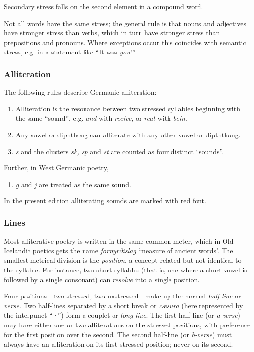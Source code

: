     Secondary stress falls on the second element in a compound word.

    Not all words have the same stress; the general rule is that nouns and adjectives have stronger stress than verbs, which in turn have stronger stress than prepositions and pronouns.  Where exceptions occur this coincides with semantic stress, e.g. in a statement like “It was \emph{you}!”

    \subsubsection{Alliteration}
    The following rules describe Germanic alliteration:

    \begin{enumerate}
      \item Alliteration is the resonance between two stressed syllables beginning with the same “sound”, e.g. \emph{and} with \emph{reeive}, or \emph{reat} with \emph{bein}.
      \item Any vowel or diphthong can alliterate with any other vowel or dipththong.
      \item \emph{s} and the clusters \emph{sk, sp} and \emph{st} are counted as four distinct “sounds”.
    \end{enumerate}

    Further, in West Germanic poetry,

    \begin{enumerate}[4.]
      \item \emph{g} and \emph{j} are treated as the same sound.
    \end{enumerate}

    In the present edition alliterating sounds are marked with red font.

    \subsubsection{Lines}
    Most alliterative poetry is written in the same common meter, which in Old Icelandic poetics gets the name \emph{fornyrðislag} ‘measure of ancient words’.  The smallest metrical division is the \emph{position}, a concept related but not identical to the syllable.  For instance, two short syllables (that is, one where a short vowel is followed by a single consonant) can \emph{resolve} into a single position.

    Four positions—two stressed, two unstressed—make up the normal \emph{half-line} or \emph{verse}.  Two half-lines separated by a short break or \emph{cæsura} (here represented by the interpunct “·”) form a couplet or \emph{long-line}.  The first half-line (or \emph{a-verse}) may have either one or two alliterations on the stressed positions, with preference for the first position over the second.  The second half-line (or \emph{b-verse}) must always have an alliteration on its first stressed position; never on its second.

